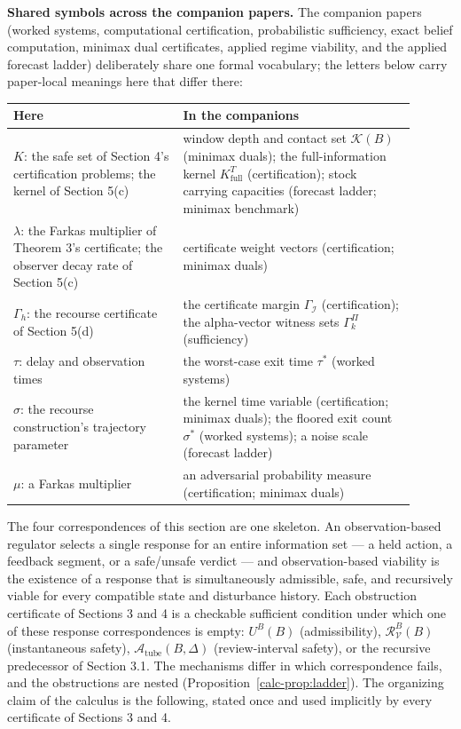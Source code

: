 \documentclass[10pt,twocolumn]{article}
\theoremstyle{definition}
\begin{document}
\medskip
\noindent\textbf{Shared symbols across the companion papers.} The
companion papers (worked systems, computational certification,
probabilistic sufficiency, exact belief computation, minimax dual
certificates, applied regime viability, and the applied forecast ladder)
deliberately share one formal vocabulary; the letters below carry
paper-local meanings here that differ there:
\begin{center}\small
\begin{tabular}{@{}p{0.38\linewidth}p{0.52\linewidth}@{}}
\toprule
\textbf{Here} & \textbf{In the companions} \\
\midrule
\(K\): the safe set of Section 4's certification problems; the kernel of Section 5(c) & window depth and contact set \(\mathcal{K}(B)\) (minimax duals); the full-information kernel \(K^{T}_{\mathrm{full}}\) (certification); stock carrying capacities (forecast ladder; minimax benchmark) \\
\(\lambda\): the Farkas multiplier of Theorem 3's certificate; the observer decay rate of Section 5(c) & certificate weight vectors (certification; minimax duals) \\
\(\Gamma_{h}\): the recourse certificate of Section 5(d) & the certificate margin \(\Gamma_{\mathcal{I}}\) (certification); the alpha-vector witness sets \(\Gamma^{\Pi}_{k}\) (sufficiency) \\
\(\tau\): delay and observation times & the worst-case exit time \(\tau^{*}\) (worked systems) \\
\(\sigma\): the recourse construction's trajectory parameter & the kernel time variable (certification; minimax duals); the floored exit count \(\sigma^{*}\) (worked systems); a noise scale (forecast ladder) \\
\(\mu\): a Farkas multiplier & an adversarial probability measure (certification; minimax duals) \\
\bottomrule
\end{tabular}
\end{center}


The four correspondences of this section are one skeleton. An
observation-based regulator selects a single response for an entire
information set --- a held action, a feedback segment, or a
safe/unsafe verdict --- and observation-based viability is the existence
of a response that is simultaneously admissible, safe, and recursively
viable for every compatible state and disturbance history. Each
obstruction certificate of Sections 3 and 4 is a checkable sufficient
condition under which one of these response correspondences is empty:
\(U^B(B)\) (admissibility), \(\mathcal{R}_{\mathcal{V}}^B(B)\)
(instantaneous safety), \(\mathcal{A}_{\mathrm{tube}}(B,\Delta)\)
(review-interval safety), or the recursive predecessor of Section 3.1.
The mechanisms differ in which correspondence fails, and the
obstructions are nested (Proposition~\ref{calc-prop:ladder}). The organizing
claim of the calculus is the following, stated once and used implicitly
by every certificate of Sections 3 and 4.
\end{document}
